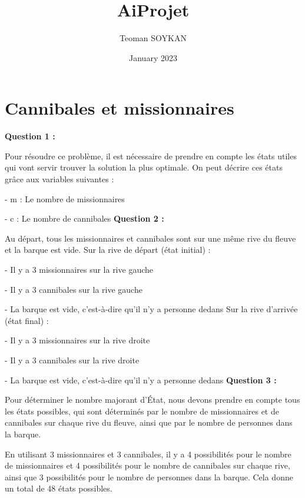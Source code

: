 \documentclass{article}
\title{AiProjet}
\author{Teoman SOYKAN}
\date{January 2023}
\begin{document}
\maketitle

\section{Cannibales et missionnaires}

\textbf{Question  1 :}
\par Pour résoudre ce problème, il est nécessaire de prendre en compte les états utiles qui vont servir trouver la solution la plus optimale. On peut décrire ces états grâce aux variables suivantes : 
\par - m : Le nombre de missionnaires  
\par - c : Le nombre de cannibales
\newline\newline
\textbf{Question  2 :}
\par Au départ, tous les missionnaires et cannibales sont sur une même rive du fleuve et la barque est vide. 
\newline
Sur la rive de départ (état initial)  : 
\par - Il y a 3 missionnaires sur la rive gauche
\par - Il y a 3 cannibales sur la rive gauche
\par - La barque est vide, c'est-à-dire qu'il n'y a personne dedans\newline
Sur la rive d'arrivée (état final) : 
\par - Il y a 3 missionnaires sur la rive droite
\par - Il y a 3 cannibales sur la rive droite
\par - La barque est vide, c'est-à-dire qu'il n'y a personne dedans
\newline\newline
\textbf{Question  3 :}
\par Pour déterminer le nombre majorant d'État, nous devons prendre en compte tous les états possibles, qui sont déterminés par le nombre de missionnaires et de cannibales sur chaque rive du fleuve, ainsi que par le nombre de personnes dans la barque. 
\par En utilisant 3 missionnaires et 3 cannibales, il y a 4 possibilités pour le nombre de missionnaires et 4 possibilités pour le nombre de cannibales sur chaque rive, ainsi que 3 possibilités pour le nombre de personnes dans la barque. Cela donne un total de 48 états possibles. 
\end{document}
